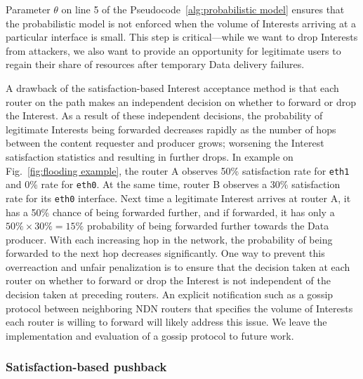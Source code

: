 Parameter $\theta$ on line 5 of the Pseudocode~\ref{alg:probabilistic model} ensures that the probabilistic model is not enforced when the volume of Interests arriving at a particular interface is small. This step is critical---while we want to drop Interests from attackers, we also want to provide an opportunity for legitimate users to regain their share of resources after temporary Data delivery failures.

A drawback of the satisfaction-based Interest acceptance method is that each router on the path makes an independent decision on whether to forward or drop the Interest. 
As a result of these independent decisions,  the probability of legitimate Interests being forwarded decreases rapidly as the number of hops between the content requester and producer grows; worsening the Interest satisfaction statistics and resulting in further drops.
In example on Fig.~\ref{fig:flooding example}, the router A observes 50\% satisfaction rate for \texttt{eth1} and 0\% rate for \texttt{eth0}. 
At the same time, router B observes a 30\% satisfaction rate for its \texttt{eth0} interface.
Next time a legitimate Interest arrives at router A, it has a 50\% chance of being forwarded further, and if forwarded, it has only a $50\% \times 30\% = 15\%$ probability of being forwarded further towards the Data producer. With each increasing hop in the network, the probability of being forwarded to the next hop decreases significantly. 
One way to prevent this overreaction and unfair penalization is to ensure that the decision taken at each router on whether to forward or drop the Interest is not independent of the decision taken at preceding routers. An explicit notification such as a gossip protocol between neighboring NDN routers that specifies the volume of Interests each router is willing to forward will likely address this issue. We leave the implementation and evaluation of a gossip protocol to future work.


\subsubsection{\textbf{Satisfaction-based pushback}}
\label{sec:dynamic limits}


